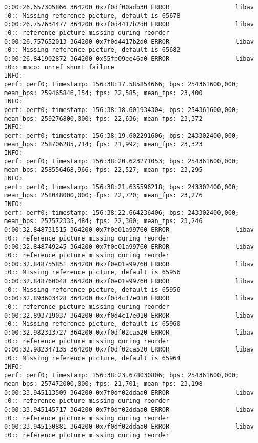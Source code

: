 \documentclass[12pt,oneside]{book}
\begin{document}
\begin{lstlisting}
0:00:26.657305866 364200 0x7f0df00adb30 ERROR                  libav :0:: Missing reference picture, default is 65678
0:00:26.757634477 364200 0x7f0d4417b2d0 ERROR                  libav :0:: reference picture missing during reorder
0:00:26.757652013 364200 0x7f0d4417b2d0 ERROR                  libav :0:: Missing reference picture, default is 65682
0:00:26.841902872 364200 0x55fb09ee46a0 ERROR                  libav :0:: mmco: unref short failure
INFO:
perf: perf0; timestamp: 156:38:17.585854666; bps: 254361600,000; mean_bps: 259465846,154; fps: 22,585; mean_fps: 23,400
INFO:
perf: perf0; timestamp: 156:38:18.601934304; bps: 254361600,000; mean_bps: 259276800,000; fps: 22,636; mean_fps: 23,372
INFO:
perf: perf0; timestamp: 156:38:19.602291606; bps: 243302400,000; mean_bps: 258706285,714; fps: 21,992; mean_fps: 23,323
INFO:
perf: perf0; timestamp: 156:38:20.623271053; bps: 254361600,000; mean_bps: 258556468,966; fps: 22,527; mean_fps: 23,295
INFO:
perf: perf0; timestamp: 156:38:21.635596218; bps: 243302400,000; mean_bps: 258048000,000; fps: 22,720; mean_fps: 23,276
INFO:
perf: perf0; timestamp: 156:38:22.664236406; bps: 243302400,000; mean_bps: 257572335,484; fps: 22,360; mean_fps: 23,246
0:00:32.848731515 364200 0x7f0e01a99760 ERROR                  libav :0:: reference picture missing during reorder
0:00:32.848749245 364200 0x7f0e01a99760 ERROR                  libav :0:: reference picture missing during reorder
0:00:32.848755851 364200 0x7f0e01a99760 ERROR                  libav :0:: Missing reference picture, default is 65956
0:00:32.848760048 364200 0x7f0e01a99760 ERROR                  libav :0:: Missing reference picture, default is 65956
0:00:32.893603428 364200 0x7f0d4c17e010 ERROR                  libav :0:: reference picture missing during reorder
0:00:32.893719037 364200 0x7f0d4c17e010 ERROR                  libav :0:: Missing reference picture, default is 65960
0:00:32.982313727 364200 0x7f0df02ca520 ERROR                  libav :0:: reference picture missing during reorder
0:00:32.982347135 364200 0x7f0df02ca520 ERROR                  libav :0:: Missing reference picture, default is 65964
INFO:
perf: perf0; timestamp: 156:38:23.678030806; bps: 254361600,000; mean_bps: 257472000,000; fps: 21,701; mean_fps: 23,198
0:00:33.945113509 364200 0x7f0df02ddaa0 ERROR                  libav :0:: reference picture missing during reorder
0:00:33.945145717 364200 0x7f0df02ddaa0 ERROR                  libav :0:: reference picture missing during reorder
0:00:33.945150881 364200 0x7f0df02ddaa0 ERROR                  libav :0:: reference picture missing during reorder

\end{lstlisting}
\end{document}
